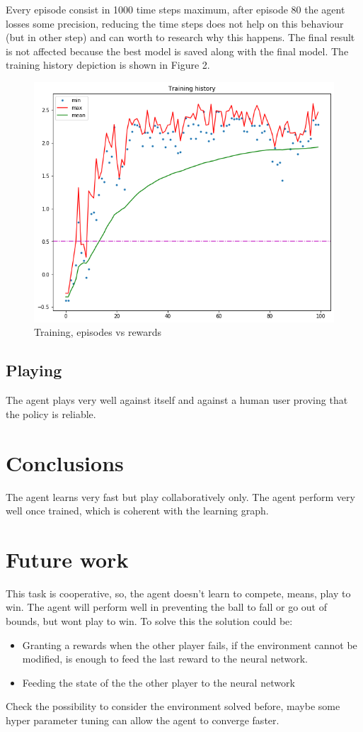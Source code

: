 \documentclass{article}
\begin{document}
Every episode consist in 1000 time steps maximum, after episode 80 the agent losses some precision, reducing the time steps does not help on this behaviour (but in other step) and can worth to research why this happens. The final result is not affected because the best model is saved along with the final model.\newline
The training history depiction is shown in Figure 2.

\begin{figure}[H]
\centering
\includegraphics[scale=0.4]{training_1000.png}
\caption{Training, episodes vs rewards}
\label{fig:train_1000}
\end{figure}
\subsection{Playing}
The agent plays very well against itself and against a human user proving that the policy is reliable.

\section{Conclusions}
The agent learns very fast but play collaboratively only.\newline
The agent perform very well once trained, which is coherent with the learning graph.
\section{Future work}
This task is cooperative, so, the agent doesn't learn to compete, means,  play to win. The agent will perform well in preventing the ball to fall or go out of bounds, but wont play to win.\newline
To solve this the solution could be:
\begin{itemize}
\item Granting a rewards when the other player fails, if the environment cannot be modified, is enough to feed the last reward to the neural network.
\item Feeding the state of the the other player to the neural network
\end{itemize}

Check the possibility to consider the environment solved before, maybe some hyper parameter tuning can allow the agent to converge faster.\newline
\printbibliography
\end{document}

